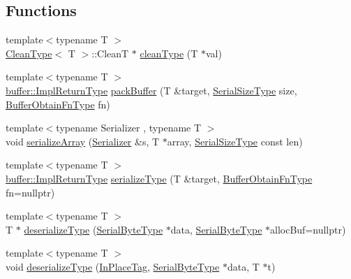 \subsection*{Functions}
\begin{DoxyCompactItemize}
\item 
{\footnotesize template$<$typename T $>$ }\\\hyperlink{structcheckpoint_1_1dispatch_1_1_clean_type}{Clean\+Type}$<$ T $>$\+::CleanT $\ast$ \hyperlink{namespacecheckpoint_1_1dispatch_ad92e256ab5d87d2a5a97ed6ed011af9c}{clean\+Type} (T $\ast$val)
\item 
{\footnotesize template$<$typename T $>$ }\\\hyperlink{namespacecheckpoint_1_1buffer_a4e930737a23dabd17333a8ea48c8edff}{buffer\+::\+Impl\+Return\+Type} \hyperlink{namespacecheckpoint_1_1dispatch_aca3c0f09e49b43fb6f3d82fe39e89295}{pack\+Buffer} (T \&target, \hyperlink{namespacecheckpoint_a083f6674da3f94c2901b18c6d238217c}{Serial\+Size\+Type} size, \hyperlink{namespacecheckpoint_a8a2558a1dd0db386339dd81c193b7f10}{Buffer\+Obtain\+Fn\+Type} fn)
\item 
{\footnotesize template$<$typename Serializer , typename T $>$ }\\void \hyperlink{namespacecheckpoint_1_1dispatch_a055fa8c0078dbd129325b1038079d87d}{serialize\+Array} (\hyperlink{structcheckpoint_1_1_serializer}{Serializer} \&s, T $\ast$array, \hyperlink{namespacecheckpoint_a083f6674da3f94c2901b18c6d238217c}{Serial\+Size\+Type} const len)
\item 
{\footnotesize template$<$typename T $>$ }\\\hyperlink{namespacecheckpoint_1_1buffer_a4e930737a23dabd17333a8ea48c8edff}{buffer\+::\+Impl\+Return\+Type} \hyperlink{namespacecheckpoint_1_1dispatch_a721d20cfc6479ca5e029671a56915adc}{serialize\+Type} (T \&target, \hyperlink{namespacecheckpoint_a8a2558a1dd0db386339dd81c193b7f10}{Buffer\+Obtain\+Fn\+Type} fn=nullptr)
\item 
{\footnotesize template$<$typename T $>$ }\\T $\ast$ \hyperlink{namespacecheckpoint_1_1dispatch_aa6898b55f6fb0de0b628567087cc8755}{deserialize\+Type} (\hyperlink{namespacecheckpoint_ae57f01cdc0b81776c23b6c7c934c58f5}{Serial\+Byte\+Type} $\ast$data, \hyperlink{namespacecheckpoint_ae57f01cdc0b81776c23b6c7c934c58f5}{Serial\+Byte\+Type} $\ast$alloc\+Buf=nullptr)
\item 
{\footnotesize template$<$typename T $>$ }\\void \hyperlink{namespacecheckpoint_1_1dispatch_a1830f5dccc7209dc2bbb3b7ac238c36a}{deserialize\+Type} (\hyperlink{structcheckpoint_1_1dispatch_1_1_in_place_tag}{In\+Place\+Tag}, \hyperlink{namespacecheckpoint_ae57f01cdc0b81776c23b6c7c934c58f5}{Serial\+Byte\+Type} $\ast$data, T $\ast$t)

\end{DoxyCompactItemize}
